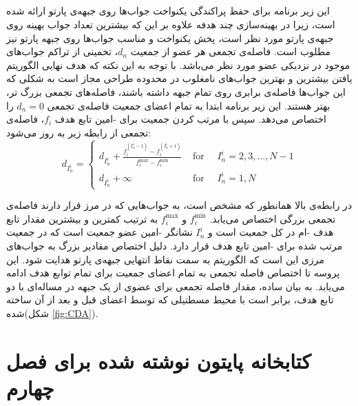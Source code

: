 \documentclass[a4paper,titlepage,12pt,fleqn,oneside]{report}
\begin{document}
	\paragraph{}
	این زیر برنامه برای حفظ پراکندگی یکنواخت جواب‌ها روی جبهه‌ی پارتو ارائه شده است، زیرا در بهینه‌سازی چند هدفه علاوه بر این که بیشترین تعداد جواب بهینه روی جبهه‌ی پارتو مورد نظر است، پخش یکنواخت و مناسب جواب‌ها روی جبهه پارتو نیز مطلوب است. فاصله‌ی تجمعی هر عضو از جمعیت $d_{n}$، تخمینی از تراکم جواب‌های موجود در نزدیکی عضو مورد نظر می‌باشد. با توجه به این نکته که هدف نهایی الگوریتم یافتن بیشترین و بهترین جواب‌های نامغلوب در محدوده طراحی مجاز است به شکلی که این جواب‌ها فاصله‌ی برابری روی تمام جبهه داشته باشند، فاصله‌های تجمعی بزرگ تر، بهتر هستند. این زیر برنامه ابتدا به تمام اعضای جمعیت فاصله‌ی تجمعی $d_{n}=0$ را اختصاص می‌دهد. سپس با مرتب کردن جمعیت برای -امین تابع هدف $f_{i}$، فاصله‌ی تجمعی از رابطه زیر به روز می‌شود:
	\begin{equation}
		d_{I_{n}^{i}}=\left\{\begin{array}{ll}
			d_{I_{n}^{i}}+\frac{f_{i}^{\left(I_{n}^{i}-1\right)}-f_{i}^{\left(I_{n}^{i}+1\right)}}{f_{i}^{\max }-f_{i}^{\min }} & \text { for } \quad I_{n}^{i}=2,3, \ldots, N-1 \\
			d_{I_{n}^{i}}+\infty & \text { for } \quad I_{n}^{i}=1, N
		\end{array}\right.
	\end{equation}
	

در رابطه‌ی بالا همانطور که مشخص است، به جواب‌هایی که در مرز قرار دارند فاصله‌ی تجمعی بزرگی اختصاص می‌یابد. $f_{i}^{\min }$ و $f_{i}^{\max }$ به ترتیب کمترین و بیشترین مقدار تابع هدف -ام در کل جمعیت است و $I_{n}^{i}$ نشانگر -امین عضو جمعیت است که در جمعیت مرتب شده برای -امین تابع هدف قرار دارد. دلیل اختصاص مقادیر بزرگ به جواب‌های مرزی این است که الگوریتم به سمت نقاط انتهایی جبهه‌ی پارتو هدایت شود. این پروسه تا اختصاص فاصله تجمعی به تمام اعضای جمعیت برای تمام توابع هدف ادامه می‌یابد.
به بیان ساده، مقدار فاصله تجمعی برای عضوی از یک جبهه در مساله‌ای با دو تابع هدف، برابر است با محیط مسطتیلی که توسط اعضای قبل و بعد از آن ساخته شده(شکل \ref{fig:CDA}).

\chapter{کتابخانه پایتون نوشته شده برای فصل چهارم }
\begin{latin}
	
\end{latin}
\end{document}
